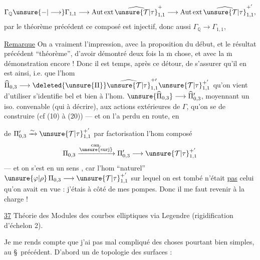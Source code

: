 
\[
\Gamma_{\mathbb Q}\unsure{-|\longrightarrow}\Gamma_{1,1}
\longrightarrow \operatorname{Aut\,ext}\widehat{\unsure{\mathcal T|\tau}}_{1,1}^{+}
\longrightarrow \operatorname{Aut\,ext}\widehat{\unsure{\mathcal T|\tau}}_{1,1}^{+'},
\]
par le théorème précédent ce composé est injectif, donc aussi
$\Gamma_{\mathbb Q}\longrightarrow\Gamma_{1,1}$, 

\uline{Remarque} On a vraiment l'impression, avec la proposition du début, et
le résultat précédent  ``théorème'', d'avoir démontré deux fois
la $\overline{\mathrm m}$ chose, et avec la $\overline{\mathrm m}$ démonstration
encore ! Donc il est temps, après ce détour, de s'assurer qu'il en est
 ainsi, i.e. que l'hom
$\widehat{\Pi}_{0,3}\longrightarrow\deleted{\unsure{\Pi}}
\widehat{\unsure{\mathcal T|\tau}}_{1,1}^{+\prime}{\unsure{\mathcal T|\tau}}_{1,1}^{+'}$ qu'on vient d'utiliser
s'identifie bel et bien à l'hom.
$\unsure{\widehat{\Pi}_{0,3}}\longrightarrow\widehat{\Pi}'_{0,3}$,
moyennant un iso. convenable (qui  à décrire),
 aux actions extérieures de $\Gamma$,
qu'on se  de construire (cf (10) à (20)) --- et on l'a
perdu en route, en


 de 
$\Pi'_{0,3}\xrightarrow{\sim}\unsure{\mathcal T|\tau}_{1,1}^{+'}$ par
factorisation  l'hom composé
\[
\Pi_{0,3}\xrightarrow{\substack{\mathrm{can.}\\\unsure{\mathrm{surj}}}}
\Pi'_{0,3}\longrightarrow\unsure{\mathcal T|\tau}_{1,1}^{+'}
\]
--- et on s'est en un sens , car l'hom ``naturel''
$\unsure{\varphi|\rho}\,\Pi_{0,3}\longrightarrow\unsure{\mathcal T|\tau}_{1,1}^{+'}$
sur lequel on est tombé n'était \uline{pas}  celui qu'on avait
en vue : j'étais à côté de mes pompes. Donc il me faut revenir à la charge !


\uline{37} Théorie des Modules des courbes elliptiques via Legendre
(rigidification d'échelon 2).

Je me rends compte que j'ai pas mal compliqué des choses pourtant bien
simples, au \S\ précédent. D'abord un  de topologie des surfaces :

